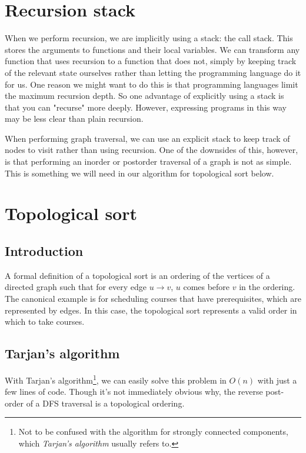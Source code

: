 \documentclass{article}
\begin{document}
\pagebreak

\section{Recursion stack}
When we perform recursion, we are implicitly using a stack: the call stack. This stores the arguments to functions and their local variables. We can transform any function that uses recursion to a function that does not, simply by keeping track of the relevant state ourselves rather than letting the programming language do it for us. One reason we might want to do this is that programming languages limit the maximum recursion depth. So one advantage of explicitly using a stack is that you can "recurse" more deeply. However, expressing programs in this way may be less clear than plain recursion.

When performing graph traversal, we can use an explicit stack to keep track of nodes to visit rather than using recursion. One of the downsides of this, however, is that performing an inorder or postorder traversal of a graph is not as simple. This is something we will need in our algorithm for topological sort below.


\section{Topological sort}
\subsection{Introduction}
A formal definition of a topological sort is an ordering of the vertices of a directed graph such that for every edge $u \rightarrow v$, $u$ comes before $v$ in the ordering. The canonical example is for scheduling courses that have prerequisites, which are represented by edges. In this case, the topological sort represents a valid order in which to take courses.

\subsection{Tarjan's algorithm}
With Tarjan's algorithm\footnote{Not to be confused with the algorithm for strongly connected components, which \textit{Tarjan's algorithm} usually refers to.}, we can easily solve this problem in $O(n)$ with just a few lines of code. Though it's not immediately obvious why, the reverse post-order of a DFS traversal is a topological ordering.
\end{document}
